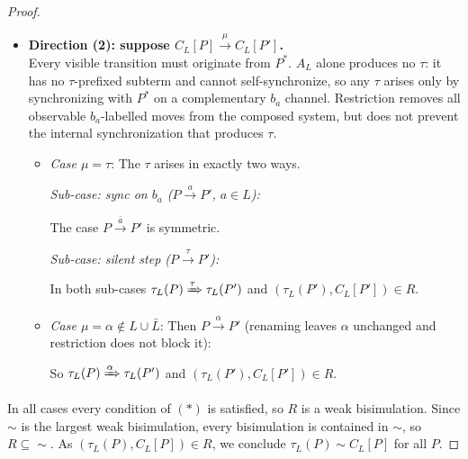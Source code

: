 \documentclass{article}
\begin{document}
\begin{proof}
\begin{itemize}
    \item \textbf{Direction (2): suppose $C_L[P] \xrightarrow{\mu} C_L[P']$.}\\
          Every visible transition must originate from $P^*$.
          $A_L$ alone produces no $\tau$: it has no $\tau$-prefixed subterm and cannot
          self-synchronize, so any $\tau$ arises only by synchronizing with $P^*$ on a
          complementary $b_a$ channel.
          Restriction removes all observable $b_a$-labelled moves from the composed
          system, but does not prevent the internal synchronization that produces $\tau$.
          \begin{itemize}
            \item \textit{Case $\mu = \tau$}:
                  The $\tau$ arises in exactly two ways.

                  \textit{Sub-case: sync on $b_a$ ($P \xrightarrow{a} P'$, $a \in L$):}
                  \begin{prooftree}
                  \end{prooftree}
                  The case $P \xrightarrow{\bar{a}} P'$ is symmetric.

                  \textit{Sub-case: silent step ($P \xrightarrow{\tau} P'$):}
                  \begin{prooftree}
                  \end{prooftree}

                  In both sub-cases $\tau_L(P) \xRightarrow{\tau} \tau_L(P')$
                  and $(\tau_L(P'), C_L[P']) \in R$.

            \item \textit{Case $\mu = \alpha \notin L \cup \bar{L}$}:
                  Then $P \xrightarrow{\alpha} P'$ (renaming leaves $\alpha$ unchanged and
                  restriction does not block it):
                  \begin{prooftree}
                  \end{prooftree}
                  So $\tau_L(P) \xRightarrow{\alpha} \tau_L(P')$ and $(\tau_L(P'), C_L[P']) \in R$.
          \end{itemize}
  \end{itemize}

In all cases every condition of $(*)$ is satisfied, so $R$ is a weak bisimulation.
Since $\sim$ is the largest weak bisimulation, every bisimulation is contained in $\sim$,
so $R \subseteq \sim$. As $(\tau_L(P), C_L[P]) \in R$, we conclude $\tau_L(P) \sim C_L[P]$ for all $P$.
\end{proof}
\end{document}
